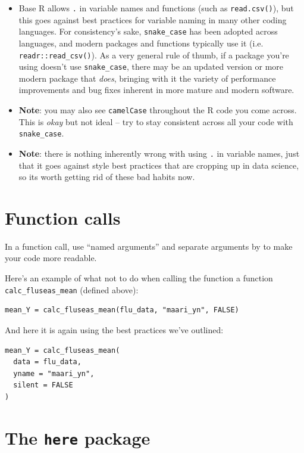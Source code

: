 \documentclass[]{book}
\begin{document}
\begin{itemize}
\item
  Base R allows \texttt{.} in variable names and functions (such as \texttt{read.csv()}), but this goes against best practices for variable naming in many other coding languages. For consistency's sake, \texttt{snake\_case} has been adopted across languages, and modern packages and functions typically use it (i.e. \texttt{readr::read\_csv()}). As a very general rule of thumb, if a package you're using doesn't use \texttt{snake\_case}, there may be an updated version or more modern package that \emph{does}, bringing with it the variety of performance improvements and bug fixes inherent in more mature and modern software.
\item
  \textbf{Note}: you may also see \texttt{camelCase} throughout the R code you come across. This is \emph{okay} but not ideal -- try to stay consistent across all your code with \texttt{snake\_case}.
\item
  \textbf{Note}: there is nothing inherently wrong with using \texttt{.} in variable names, just that it goes against style best practices that are cropping up in data science, so its worth getting rid of these bad habits now.
\end{itemize}

\hypertarget{function-calls}{%
\section{Function calls}\label{function-calls}}

In a function call, use ``named arguments'' and separate arguments by to make your code more readable.

Here's an example of what not to do when calling the function a function \texttt{calc\_fluseas\_mean} (defined above):

\begin{verbatim}
mean_Y = calc_fluseas_mean(flu_data, "maari_yn", FALSE)
\end{verbatim}

And here it is again using the best practices we've outlined:

\begin{verbatim}
mean_Y = calc_fluseas_mean(
  data = flu_data, 
  yname = "maari_yn",
  silent = FALSE
)
\end{verbatim}

\hypertarget{the-here-package}{%
\section{\texorpdfstring{The \texttt{here} package}{The here package}}\label{the-here-package}}
\end{document}
